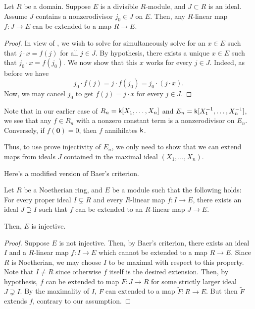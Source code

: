 \begin{prop}
	Let $R$ be a domain. Suppose $E$ is a divisible $R$-module, and $J \subset R$ is an ideal. Assume $J$ contains a nonzerodivisor $j_{0} \in J$ on $E$. Then, any $R$-linear map $f : J \to E$ can be extended to a map $R \to E$.
\end{prop}
\begin{proof}
	In view of , we wish to solve for simultaneously solve for an $x \in E$ such that $j \cdot x = f(j)$ for all $j \in J$. By hypothesis, there exists a unique $x \in E$ such that $j_{0} \cdot x = f(j_{0})$. We now show that this $x$ works for every $j \in J$. Indeed, as before we have
	\begin{equation*} 
		j_{0} \cdot f(j) = j \cdot f(j_{0}) = j_{0} \cdot (j \cdot x).
	\end{equation*}
	Now, we may cancel $j_{0}$ to get $f(j) = j \cdot x$ for every $j \in J$.
\end{proof}

\begin{rem} \label{rem:nonzerodivisor-constant-term}
	Note that in our earlier case of $R_{n} = \mathsf{k}[X_{1}, \ldots, X_{n}]$ and $E_{n} = \mathsf{k}[X_{1}^{-1}, \ldots, X_{n}^{-1}]$, we see that any $f \in R_{n}$ with a nonzero constant term is a nonzerodivisor on $E_{n}$. Conversely, if $f(\mathbf{0}) = 0$, then $f$ annihilates $\mathsf{k}$. 

	Thus, to use prove injectivity of $E_{n}$, we only need to show that we can extend maps from ideals $J$ contained in the maximal ideal $(X_{1}, \ldots, X_{n})$.
\end{rem}

Here's a modified version of Baer's criterion. 

\begin{prop}
	Let $R$ be a Noetherian ring, and $E$ be a module such that the following holds: For every proper ideal $I \subsetneq R$ and every $R$-linear map $f : I \to E$, there exists an ideal $J \supsetneq I$ such that $f$ can be extended to an $R$-linear map $J \to E$.

	Then, $E$ is injective.
\end{prop}
\begin{proof} 
	Suppose $E$ is not injective. Then, by Baer's criterion, there exists an ideal $I$ and a $R$-linear map $f : I \to E$ which cannot be extended to a map $R \to E$. Since $R$ is Noetherian, we may choose $I$ to be maximal with respect to this property. Note that $I \neq R$ since otherwise $f$ itself is the desired extension. Then, by hypothesis, $f$ can be extended to map $F : J \to R$ for some strictly larger ideal $J \supsetneq I$. By the maximality of $I$, $F$ can extended to a map $\widetilde{F} : R \to E$. But then $\widetilde{F}$ extends $f$, contrary to our assumption.
\end{proof}

